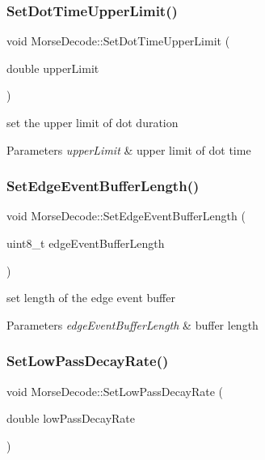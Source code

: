 \subsubsection{\texorpdfstring{Set\+Dot\+Time\+Upper\+Limit()}{SetDotTimeUpperLimit()}}
{\footnotesize\ttfamily void Morse\+Decode\+::\+Set\+Dot\+Time\+Upper\+Limit (\begin{DoxyParamCaption}\item[{double}]{upper\+Limit }\end{DoxyParamCaption})}



set the upper limit of dot duration 


\begin{DoxyParams}{Parameters}
{\em upper\+Limit} & upper limit of dot time \\
\hline
\end{DoxyParams}
\mbox{\label{classMorseDecode_a854d3dd4a5ec6a6a989543baa4d859c3}} 
\subsubsection{\texorpdfstring{Set\+Edge\+Event\+Buffer\+Length()}{SetEdgeEventBufferLength()}}
{\footnotesize\ttfamily void Morse\+Decode\+::\+Set\+Edge\+Event\+Buffer\+Length (\begin{DoxyParamCaption}\item[{uint8\+\_\+t}]{edge\+Event\+Buffer\+Length }\end{DoxyParamCaption})}



set length of the edge event buffer 


\begin{DoxyParams}{Parameters}
{\em edge\+Event\+Buffer\+Length} & buffer length \\
\hline
\end{DoxyParams}
\mbox{\label{classMorseDecode_ac85b7ab4f9e29a9ccb489df2d3501840}} 
\subsubsection{\texorpdfstring{Set\+Low\+Pass\+Decay\+Rate()}{SetLowPassDecayRate()}}
{\footnotesize\ttfamily void Morse\+Decode\+::\+Set\+Low\+Pass\+Decay\+Rate (\begin{DoxyParamCaption}\item[{double}]{low\+Pass\+Decay\+Rate }\end{DoxyParamCaption})}



